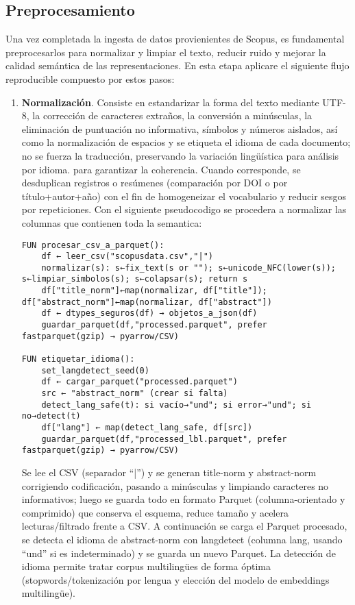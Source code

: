 \subsection{Preprocesamiento}
Una vez completada la ingesta de datos provienientes de Scopus, es fundamental preprocesarlos para normalizar y limpiar el texto, reducir ruido y mejorar la calidad semántica de las representaciones.
En esta etapa aplicare el siguiente flujo reproducible compuesto por estos pasos:
\begin{enumerate}
    \item \textbf{Normalización}. Consiste en estandarizar la forma del texto mediante 
    UTF-8, la corrección de caracteres extraños, la conversión a minúsculas, la eliminación de puntuación no informativa, 
    símbolos y números aislados, así como la normalización de espacios y se etiqueta el idioma de cada documento; no se fuerza la traducción, preservando la variación lingüística para análisis por idioma.
    para garantizar la coherencia. Cuando corresponde, se desduplican registros o resúmenes 
    (comparación por DOI o por título+autor+año) con el fin de homogeneizar el vocabulario y reducir sesgos por repeticiones.
Con el siguiente pseudocodigo se procedera a normalizar las columnas que contienen toda la semantica:
\begin{verbatim}
FUN procesar_csv_a_parquet():
    df ← leer_csv("scopusdata.csv","|")
    normalizar(s): s←fix_text(s or ""); s←unicode_NFC(lower(s)); s←limpiar_simbolos(s); s←colapsar(s); return s
    df["title_norm"]←map(normalizar, df["title"]); df["abstract_norm"]←map(normalizar, df["abstract"])
    df ← dtypes_seguros(df) → objetos_a_json(df)
    guardar_parquet(df,"processed.parquet", prefer fastparquet(gzip) → pyarrow/CSV)

FUN etiquetar_idioma():
    set_langdetect_seed(0)
    df ← cargar_parquet("processed.parquet")
    src ← "abstract_norm" (crear si falta)
    detect_lang_safe(t): si vacío→"und"; si error→"und"; si no→detect(t)
    df["lang"] ← map(detect_lang_safe, df[src])
    guardar_parquet(df,"processed_lbl.parquet", prefer fastparquet(gzip) → pyarrow/CSV)
\end{verbatim}
Se lee el CSV (separador “|”) y se generan title-norm y abstract-norm corrigiendo codificación, pasando a 
minúsculas y limpiando caracteres no informativos; luego se guarda todo en formato Parquet (columna-orientado y 
comprimido) que conserva el esquema, reduce tamaño y acelera lecturas/filtrado frente a CSV. A continuación se 
carga el Parquet procesado, se detecta el idioma de abstract-norm con langdetect (columna lang, usando “und” si
es indeterminado) y se guarda un nuevo Parquet. La detección de idioma permite tratar corpus multilingües de forma óptima (stopwords/tokenización por lengua y elección del modelo de embeddings multilingüe).


\end{enumerate}
